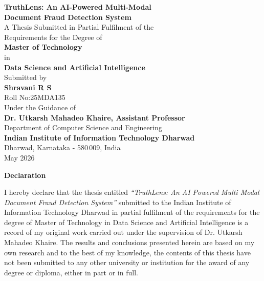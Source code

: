 \documentclass[12pt,a4paper,oneside]{report}
\begin{document}
\begin{titlepage}
\centering\vspace*{0.5cm}
{\LARGE\bfseries TruthLens: An AI-Powered Multi-Modal\\[8pt]
 Document Fraud Detection System}\\[1.2cm]
{\large A Thesis Submitted in Partial Fulfilment of the\\[4pt]
 Requirements for the Degree of}\\[0.7cm]
{\Large\bfseries Master of Technology}\\[4pt]{\large in}\\[4pt]
{\Large\bfseries Data Science and Artificial Intelligence}\\[1.2cm]
{\large Submitted by}\\[0.4cm]
{\Large\bfseries Shravani R S}\\[0.2cm]
{\large Roll No:\quad25MDA135}\\[1.0cm]
{\large Under the Guidance of}\\[0.3cm]
{\large\bfseries Dr. Utkarsh Mahadeo Khaire, Assistant Professor}\\[0.2cm]
{\large Department of Computer Science and Engineering}\\[1.0cm]
{\large\bfseries Indian Institute of Information Technology Dharwad}\\[0.2cm]
{\large Dharwad, Karnataka - 580\,009, India}\\[0.8cm]
{\large May 2026}
\end{titlepage}

\newpage\thispagestyle{plain}
\begin{center}{\Large\bfseries Declaration}\end{center}\vspace{0.8cm}
\noindent I hereby declare that the thesis entitled \textit{``TruthLens:
An AI Powered Multi Modal Document Fraud Detection System''} submitted to the
Indian Institute of Information Technology Dharwad in partial fulfilment of
the requirements for the degree of Master of Technology in Data Science and
Artificial Intelligence is a record of my original work carried out under the
supervision of Dr. Utkarsh Mahadeo Khaire. The results and conclusions presented herein
are based on my own research and to the best of my knowledge, the contents of
this thesis have not been submitted to any other university or institution for
the award of any degree or diploma, either in part or in full.
\end{document}
